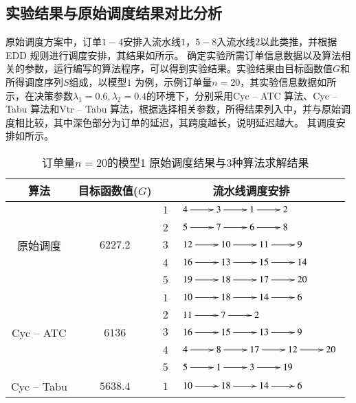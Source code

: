 \subsection{实验结果与原始调度结果对比分析}
原始调度方案中，订单$1-4$安排入流水线$1$，$5-8$入流水线$2$以此类推，并根据EDD 规则进行调度安排，其结果如所示。
确定实验所需订单信息数据以及算法相关的参数，运行编写的算法程序，可以得到实验结果。实验结果由目标函数值$G$和所得调度序列$S$组成，以模型$1$ 为例，示例订单量$n = 20$，其实验信息数据如所示，在决策参数$\lambda_1 = 0.6, \lambda_2 = 0.4$的环境下，分别采用Cyc -- ATC 算法、Cyc -- Tabu 算法和Vtr -- Tabu 算法，根据选择相关参数，所得结果列入中，并与原始调度相比较，其中深色部分为订单的延迟，其跨度越长，说明延迟越大。
其调度安排如所示。
\begin{table}[h!]
  \centering
  \label{tab:resultmodel1}\caption{订单量$n = 20$的模型1 原始调度结果与$3$种算法求解结果}
    \begin{tabular}{cccl}
    \toprule
    算法    & 目标函数值($G$) & \multicolumn{2}{c}{流水线调度安排} \\
    \midrule
    \multirow{5}[2]{*}{原始调度} & \multirow{5}[2]{*}{$6227.2$} & $1$
        &  $\xymatrix{4 \ar[r] & 3 \ar[r] & 1 \ar[r] & 2}$\\
         &        & $2$     &  $\xymatrix{5 \ar[r] & 7 \ar[r]& 6 \ar [r]& 8}$\\
         &        & $3$     &  $\xymatrix{12 \ar[r] & 10 \ar[r] & 11 \ar[r] & 9}$\\
         &        & $4$     &  $\xymatrix{16 \ar[r] & 13 \ar[r]& 15 \ar[r] & 14}$\\
         &        & $5$     &  $\xymatrix{19 \ar[r] &18 \ar[r] & 17 \ar[r] &20}$\\
      \hline
    \multirow{5}[2]{*}{Cyc -- ATC} & \multirow{5}[2]{*}{$6136$} & $1$     &$\xymatrix{10 \ar[r] & 18 \ar[r] & 14 \ar[r] & 6}$\\
          &       & $2$     &  $\xymatrix{11 \ar[r] & 7 \ar[r] & 2}$\\
          &       & $3$     &  $\xymatrix{16 \ar[r] & 15 \ar[r] & 13 \ar[r] & 9}$\\
          &       & $4$     &  $\xymatrix{4 \ar[r] & 8 \ar[r] & 17 \ar[r] & 12 \ar[r]&20}$\\
          &       & $5$     &  $\xymatrix{5 \ar[r] & 1 \ar[r] & 3 \ar[r] & 19}$\\
     \hline
    \multirow{5}[2]{*}{Cyc -- Tabu} & \multirow{5}[2]{*}{$5638.4$} & $1$     &  $\xymatrix{10 \ar[r] & 18 \ar[r] & 14 \ar[r] & 6}$\\

\end{tabular}
\end{table}
